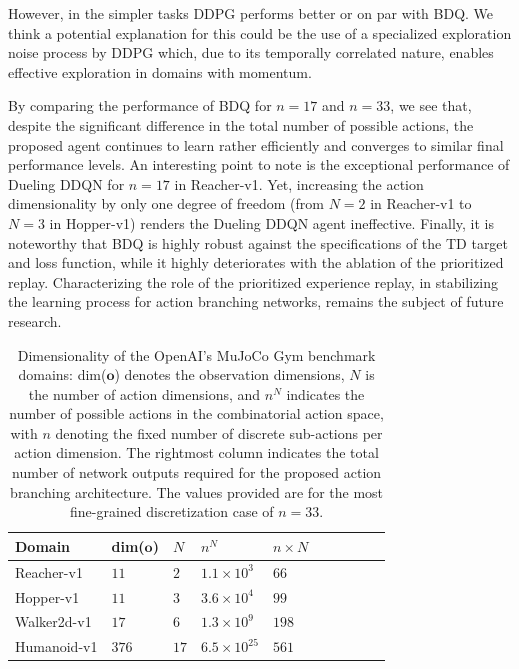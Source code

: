 \documentclass[letterpaper]{article}
\begin{document}
However, in the simpler tasks DDPG performs better or on par with BDQ. We think a potential explanation for this could be the use of a specialized exploration noise process by DDPG which, due to its temporally correlated nature, enables effective exploration in domains with momentum.

By comparing the performance of BDQ for $n=17$ and $n=33$, we see that, despite the significant difference in the total number of possible actions, the proposed agent continues to learn rather efficiently and converges to similar final performance levels. An interesting point to note is the exceptional performance of Dueling DDQN for $n=17$ in Reacher-v1. Yet, increasing the action dimensionality by only one degree of freedom (from $N=2$ in Reacher-v1 to $N=3$ in Hopper-v1) renders the Dueling DDQN agent ineffective.
Finally, it is noteworthy that BDQ is highly robust against the specifications of the TD target and loss function, while it highly deteriorates with the ablation of the prioritized replay. Characterizing the role of the prioritized experience replay, in stabilizing the learning process for action branching networks, remains the subject of future research.

\begin{table}[t!]
\begin{center}
\begin{adjustbox}{width=0.07\columnwidth}
\begin{tabular}{llllllllll}
\toprule
Domain  & dim($\boldsymbol{o}$) & $N$ & $n^N$ & $n \times N$ \\
\midrule
Reacher-v1 & $11$ & $2$ & $1.1 \times 10^{3}$ & $66$ \\
Hopper-v1  & $11$ & $3$ & $3.6 \times 10^{4}$ & $99$ \\
Walker2d-v1 & $17$ & $6$ & $1.3 \times 10^{9}$ & $198$ \\
Humanoid-v1 & $376$ & $17$ & $6.5 \times 10^{25}$ & $561$ \\
\bottomrule
\end{tabular}
\end{adjustbox}
\end{center}
\caption{Dimensionality of the OpenAI's MuJoCo Gym benchmark domains: dim($\boldsymbol{o}$) denotes the observation dimensions, $N$ is the number of action dimensions, and $n^N$ indicates the number of possible actions in the combinatorial action space, with $n$ denoting the fixed number of discrete sub-actions per action dimension. The rightmost column indicates the total number of network outputs required for the proposed action branching architecture. The values provided are for the most fine-grained discretization case of $n=33$.}
\label{table:dim_specs_OpenAI_benchmarks}
\end{table}
\end{document}
